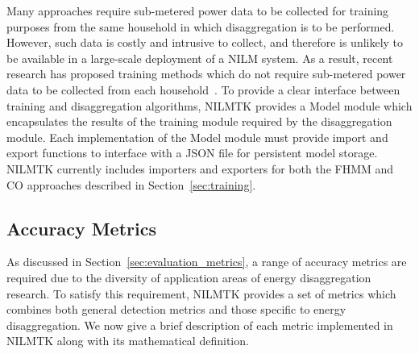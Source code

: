 \documentclass{sig-alternate}
\newcommand{\bluecolor}[1]{\textcolor{blue}{#1}}
\newcommand{\secref}[1]{Section~\ref{#1}}
\begin{document}
\noindent
Many approaches require sub-metered power data to be collected for training purposes from the same household in which disaggregation is to be performed. However, such data is costly and intrusive to collect, and therefore is unlikely to be available in a large-scale deployment of a NILM system. As a result, recent research has proposed training methods which do not require sub-metered power data to be collected from each household~\cite{kim_2011,parson_2012}. To provide a clear interface between training and disaggregation algorithms, NILMTK provides a Model module which encapsulates the results of the training module required by the disaggregation module. Each implementation of the Model module must provide import and export functions to interface with a JSON file for persistent model storage. NILMTK currently includes importers and exporters for both the FHMM and CO approaches described in \secref{sec:training}.


\subsection{Accuracy Metrics}
\label{sec:metrics}

\noindent
As discussed in \secref{sec:evaluation_metrics}, a range of accuracy metrics are required due to the diversity of application areas of energy disaggregation research. To satisfy this requirement, NILMTK provides a set of metrics which combines both general detection metrics and those specific to energy disaggregation. We now give a brief description of each metric implemented in NILMTK along with its mathematical definition.
\end{document}
